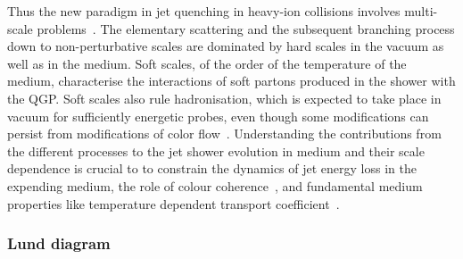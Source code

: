 Thus the new paradigm in jet quenching in heavy-ion collisions involves multi-scale problems~\cite{Kurkela:2014tla,Tachibana:2018yae}. The elementary scattering and the subsequent branching process down to non-perturbative scales are dominated by hard scales in the vacuum as well as in the medium. Soft scales, of the order of the temperature of the medium, characterise the interactions of soft partons produced in the shower with the QGP. Soft scales also rule hadronisation, which is expected to take place in vacuum for sufficiently energetic probes, even though some modifications can persist from modifications of color flow~\cite{Aurenche:2011rd,Beraudo:2011bh,Beraudo:2012bq}. Understanding the contributions from the different processes to the jet shower evolution in medium and their scale dependence is crucial to to constrain the dynamics of jet energy loss in the expending medium, the role of colour coherence~\cite{CasalderreySolana:2012ef}, and fundamental medium properties like temperature dependent transport coefficient~\cite{DEramo:2012uzl,Ayala:2016pvm}.


\subsubsection*{Lund diagram}

